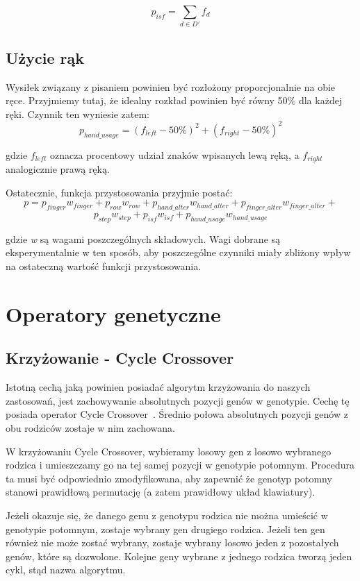 \documentclass[brudnopis]{xmgr}
\begin{document}
$$ p_{isf} = \sum\limits_{d \in D'} f_d $$


\subsection{Użycie rąk}

Wysiłek związany z pisaniem powinien być rozłożony proporcjonalnie na obie ręce. Przyjmiemy tutaj, że idealny rozkład powinien być równy 50\% dla każdej ręki. Czynnik ten wyniesie zatem:
$$ p_{hand\_usage} = (f_{left} - 50\%)^2 + (f_{right} - 50\%)^2 $$

gdzie $f_{left}$ oznacza procentowy udział znaków wpisanych lewą ręką, a $f_{right}$ analogicznie prawą ręką.\newline\newline


\noindent Ostatecznie, funkcja przystosowania przyjmie postać:
$$ p = p_{finger} w_{finger} + p_{row} w_{row} + p_{hand\_alter} w_{hand\_alter} + p_{finger\_alter} w_{finger\_alter} + $$
$$ p_{step} w_{step} + p_{isf} w_{isf} + p_{hand\_usage} w_{hand\_usage} $$

\noindent
gdzie \emph{w} są wagami poszczególnych składowych. Wagi dobrane są eksperymentalnie w ten sposób, aby poszczególne czynniki miały zbliżony wpływ na ostateczną wartość funkcji przystosowania.


\section{Operatory genetyczne}

\subsection{Krzyżowanie - Cycle Crossover}

Istotną cechą jaką powinien posiadać algorytm krzyżowania do naszych zastosowań, jest zachowywanie absolutnych pozycji genów w genotypie. Cechę tę posiada operator Cycle Crossover~\cite{Operators:2000:TSP}. Średnio połowa absolutnych pozycji genów z obu rodziców zostaje w nim zachowana.

W krzyżowaniu Cycle Crossover, wybieramy losowy gen z losowo wybranego rodzica i umieszczamy go na tej samej pozycji w genotypie potomnym. Procedura ta musi być odpowiednio zmodyfikowana, aby zapewnić że genotyp potomny stanowi prawidłową permutację (a zatem prawidłowy układ klawiatury).

Jeżeli okazuje się, że danego genu z genotypu rodzica nie można umieścić w genotypie potomnym, zostaje wybrany gen drugiego rodzica. Jeżeli ten gen również nie może zostać wybrany, zostaje wybrany losowo jeden z pozostałych genów, które są dozwolone. Kolejne geny wybrane z jednego rodzica tworzą jeden cykl, stąd nazwa algorytmu.
\end{document}
